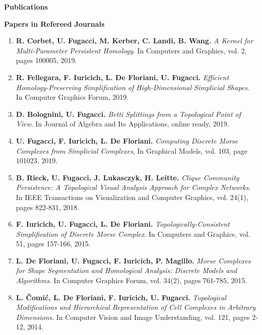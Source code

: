 \documentclass[11pt]{article}
\begin{document}


\vspace*{3ex}
\noindent
{\Large\bf Publications}

\vspace*{1.5ex}

\noindent
{\bf Papers in Refereed Journals}

\begin{enumerate}

\item {\bf R. Corbet, U. Fugacci, M. Kerber, C. Landi, B. Wang.} {\em A Kernel for Multi-Parameter Persistent Homology}. In Computers and Graphics, vol. 2, pages 100005, 2019.

\item {\bf R. Fellegara, F. Iuricich, L. De Floriani, U. Fugacci.} {\em Efficient Homology-Preserving Simplification of High-Dimensional Simplicial Shapes}. In Computer Graphics Forum, 2019.

\item {\bf D. Bolognini, U. Fugacci.} {\em Betti Splittings from a Topological Point of View}. In Journal of Algebra and Its Applications, online ready, 2019.

\item {\bf U. Fugacci, F. Iuricich, L. De Floriani.} {\em Computing Discrete Morse Complexes from Simplicial Complexes}, In Graphical Models, vol. 103, page 101023, 2019.

\item {\bf B. Rieck, U. Fugacci, J. Lukasczyk, H. Leitte.} {\em Clique Community Persistence: A Topological Visual Analysis Approach for Complex Networks}. In IEEE Transactions on Visualization and Computer Graphics, vol. 24(1), pages 822-831, 2018.

\item {\bf F. Iuricich, U. Fugacci, L. De Floriani.} {\em Topologically-Consistent Simplification of Discrete Morse Complex}. In Computers and Graphics, vol. 51, pages 157-166, 2015. %

\item {\bf L. De Floriani, U. Fugacci, F. Iuricich, P. Magillo.} {\em Morse Complexes for Shape Segmentation and Homological Analysis: Discrete Models and Algorithms}. In Computer Graphics Forum, vol. 34(2), pages 761-785, 2015.

\item {\bf L. {\v C}omi{\' c}, L. De Floriani, F. Iuricich, U. Fugacci.} {\em Topological Modifications and Hierarchical Representation of Cell Complexes in Arbitrary Dimensions}. In Computer Vision and Image Understanding, vol. 121, pages 2-12, 2014.

\end{enumerate}
\vspace*{1ex}
\end{document}
